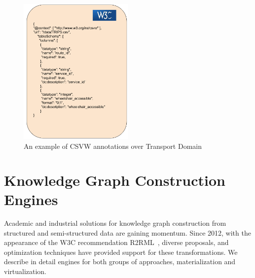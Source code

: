 \begin{figure}[!ht]
\centering
\includegraphics[width=0.5\textwidth]{figures/state-of-the-art/CVSW example.pdf}
\caption{An example of CSVW annotations over Transport Domain}
\label{fig:soa_csvw_example}
\end{figure}





\section{Knowledge Graph Construction Engines}
\label{sec:soa_engines}
Academic and industrial solutions for knowledge graph construction from structured and semi-structured data are gaining momentum. Since 2012, with the appearance of the W3C recommendation R2RML~\citep{R2RML}, diverse proposals, and optimization techniques have provided support for these transformations. We describe in detail engines for both groups of approaches, materialization and virtualization.

